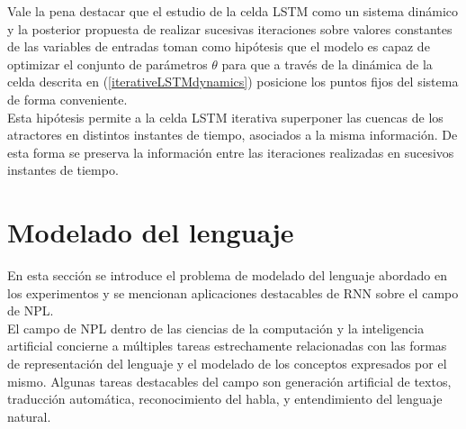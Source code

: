 \documentclass{article}
\begin{document}
	Vale la pena destacar que el estudio de la celda LSTM como un sistema dinámico y la posterior propuesta de realizar sucesivas iteraciones sobre valores constantes de las variables de entradas toman como hipótesis que el modelo es capaz de optimizar el conjunto de parámetros $\theta$ para que a través de la dinámica de la celda descrita en (\ref{iterativeLSTMdynamics}) posicione los puntos fijos del sistema de forma conveniente.\\
	Esta hipótesis permite a la celda LSTM iterativa superponer las cuencas de los atractores en distintos instantes de tiempo, asociados a la misma información. De esta forma se preserva la información entre las iteraciones realizadas en sucesivos instantes de tiempo.
	
	\section{Modelado del lenguaje}\label{sectionLanguageModeling}
	En esta sección se introduce el problema de modelado del lenguaje abordado en los experimentos y se mencionan aplicaciones destacables de RNN sobre el campo de NPL.\\
	El campo de NPL dentro de las ciencias de la computación y la inteligencia artificial concierne a múltiples tareas estrechamente relacionadas con las formas de representación del lenguaje y el modelado de los conceptos expresados por el mismo. Algunas tareas destacables del campo son generación artificial de textos, traducción automática, reconocimiento del habla, y entendimiento del lenguaje natural.\\
	
\end{document}
